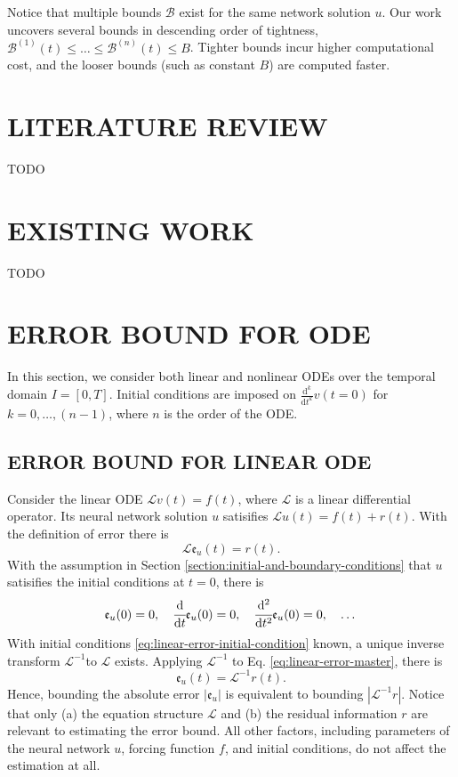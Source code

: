 \documentclass[accepted]{uai2023}
\newcommand{\dt}[1]{\cfrac{\mathrm{d} #1}{\mathrm{d} t}}
\newcommand{\dnt}[2]{\cfrac{\mathrm{d}^{#1} #2}{\mathrm{d} t^{#1}}}
\newcommand{\Err}{\mathfrak{e}}
\newcommand{\Bound}{\mathcal{B}}
\renewcommand{\L}{\mathcal{L}}
\begin{document}
    Notice that multiple bounds $\Bound$ exist for the same network solution $u$.
    Our work uncovers several bounds in descending order of tightness, $\Bound^{(1)}(t) \leq \dots \leq \Bound^{(n)}(t) \leq B$. Tighter bounds incur higher computational cost, and the looser bounds (such as constant $B$) are computed faster.


\section{LITERATURE REVIEW}
    TODO

\section{EXISTING WORK}
    TODO
\section{ERROR BOUND FOR ODE}
    In this section, we consider both linear and nonlinear ODEs over the temporal domain $I=[0, T]$. 
    Initial conditions are imposed on $\frac{\mathrm{d}^k}{\mathrm{d}t^k}v(t=0)$ for $k = 0, \dots, (n - 1)$, where $n$ is the order of the ODE.

\subsection{ERROR BOUND FOR LINEAR ODE}\label{section:error-bound-for-linear-odes}
    Consider the linear ODE $\L v(t) = f(t)$, where $\L$ is a linear differential operator. 
    Its neural network solution $u$ satisifies $\L u(t) = f(t) + r(t)$. 
    With the definition of error there is
    {   
        \small
        \begin{equation} \label{eq:linear-error-master}
            \L \Err_u(t) = r(t).
        \end{equation}
    }
    With the assumption in Section \ref{section:initial-and-boundary-conditions} that $u$ satisifies the initial conditions at $t=0$, there is
    {
        \small
        \begin{equation} \label{eq:linear-error-initial-condition}
            \Err_u(0) = 0, \quad \dt{}{}\Err_u(0) = 0, \quad \dnt{2}{}\Err_u(0) = 0, \quad \dots 
        \end{equation}
    }
    With initial conditions \ref{eq:linear-error-initial-condition} known, a unique inverse transform $\L^{-1}$to $\L$ exists. 
    Applying $\L^{-1}$ to Eq. \ref{eq:linear-error-master}, there is 
    {
        \small
        \begin{equation}\label{eq:linear-error-inverse-master}
            \Err_u(t) = \L^{-1} r(t).
        \end{equation}
    }
    Hence, bounding the absolute error $\left|\Err_u\right|$ is equivalent to bounding $\left|\L^{-1} r\right|$. 
    Notice that only (a) the equation structure $\L$ and (b) the residual information $r$ are relevant to estimating the error bound. 
    All other factors, including parameters of the neural network $u$, forcing function $f$, and initial conditions, do not affect the estimation at all.
\end{document}
